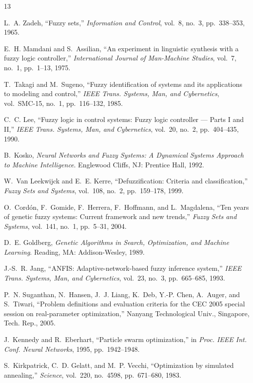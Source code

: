 \begin{thebibliography}{13}


L.~A. Zadeh, ``Fuzzy sets,'' \emph{Information and Control}, vol.~8, no.~3, pp.~338--353, 1965.

E.~H. Mamdani and S.~Assilian, ``An experiment in linguistic synthesis with a fuzzy logic
controller,'' \emph{International Journal of Man-Machine Studies}, vol.~7, no.~1, pp.~1--13, 1975.

T.~Takagi and M.~Sugeno, ``Fuzzy identification of systems and its applications to modeling and
control,'' \emph{IEEE Trans. Systems, Man, and Cybernetics}, vol.~SMC-15, no.~1, pp.~116--132,
1985.

C.~C. Lee, ``Fuzzy logic in control systems: Fuzzy logic controller --- Parts I and II,''
\emph{IEEE Trans. Systems, Man, and Cybernetics}, vol.~20, no.~2, pp.~404--435, 1990.

B.~Kosko, \emph{Neural Networks and Fuzzy Systems: A Dynamical Systems Approach to Machine
Intelligence}. Englewood Cliffs, NJ: Prentice Hall, 1992.

W.~Van Leekwijck and E.~E. Kerre, ``Defuzzification: Criteria and classification,'' \emph{Fuzzy
Sets and Systems}, vol.~108, no.~2, pp.~159--178, 1999.

O.~Cord\'{o}n, F.~Gomide, F.~Herrera, F.~Hoffmann, and L.~Magdalena, ``Ten years of genetic fuzzy
systems: Current framework and new trends,'' \emph{Fuzzy Sets and Systems}, vol.~141, no.~1,
pp.~5--31, 2004.

D.~E. Goldberg, \emph{Genetic Algorithms in Search, Optimization, and Machine Learning}. Reading,
MA: Addison-Wesley, 1989.

J.-S.~R. Jang, ``ANFIS: Adaptive-network-based fuzzy inference system,'' \emph{IEEE Trans.
Systems, Man, and Cybernetics}, vol.~23, no.~3, pp.~665--685, 1993.

P.~N. Suganthan, N.~Hansen, J.~J. Liang, K.~Deb, Y.-P. Chen, A.~Auger, and S.~Tiwari, ``Problem
definitions and evaluation criteria for the CEC 2005 special session on real-parameter
optimization,'' Nanyang Technological Univ., Singapore, Tech. Rep., 2005.

J.~Kennedy and R.~Eberhart, ``Particle swarm optimization,'' in \emph{Proc. IEEE Int. Conf. Neural
Networks}, 1995, pp.~1942--1948.

S.~Kirkpatrick, C.~D. Gelatt, and M.~P. Vecchi, ``Optimization by simulated annealing,''
\emph{Science}, vol.~220, no.~4598, pp.~671--680, 1983.

\end{thebibliography}
